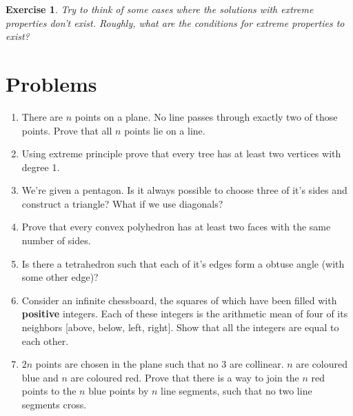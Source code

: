 \documentclass{article}
\newtheorem{exercise}{Exercise}
\begin{document}
\begin{exercise}
Try to think of some cases where the solutions with extreme properties \emph{don't} exist. Roughly, what are the conditions for extreme properties to exist?
\end{exercise}

\section{Problems}

\begin{enumerate}

<<<<<<< HEAD
	\item{There are $n$ points on a plane. No line passes through exactly two of those points. Prove that all $n$ points lie on a line.}

	\item{Using extreme principle prove that every tree has at least two vertices with degree 1.}
	
	\item{We're given a pentagon. Is it always possible to choose three of it's sides and construct a triangle? What if we use diagonals?}
	
	\item{Prove that every convex polyhedron has at least two faces with the same number of sides.}
	
	\item{Is there a tetrahedron such that each of it's edges form a obtuse angle (with some other edge)?}
	
	\item{Consider an infinite chessboard, the squares of which have been filled with \textbf{positive} integers. Each of these integers is the arithmetic mean of four of its neighbors [above, below, left, right]. Show that all the integers are equal to each other.}
	
	\item{$2n$ points are chosen in the plane such that no $3$ are collinear. $n$ are coloured blue and $n$ are coloured red. Prove that there is a way to join the $n$ red points to the $n$ blue points by $n$ line segments, such that no two line segments cross.}
	
	

\end{enumerate}
\end{document}
